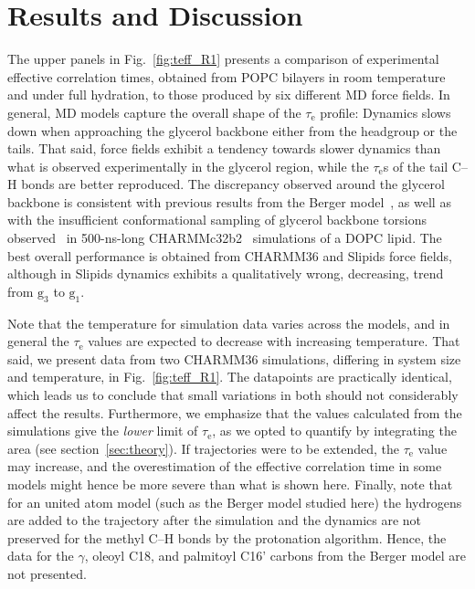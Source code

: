 \documentclass[journal=jpcbfk,manuscript=article,layout=twocolumn]{achemso}
\begin{document}

\section{Results and Discussion}

The upper panels in
Fig.~\ref{fig:teff_R1} presents a comparison of experimental effective correlation times, obtained from POPC bilayers in room temperature and under full hydration, to those produced by six different MD force fields. In general, MD models capture the overall shape of the $\tau_\mathrm{e}$ profile: Dynamics slows down when approaching the glycerol backbone either from the headgroup or the tails. That said, force fields exhibit a tendency towards slower dynamics than what is observed experimentally in the glycerol region, while the $\tau_\mathrm{e}$s of the tail C--H bonds are better reproduced. The discrepancy observed around the glycerol backbone is consistent with previous results from the Berger model~\cite{ferreira15}, as well as with the insufficient conformational sampling of glycerol backbone torsions observed~\cite{vogel12} in 500-ns-long CHARMMc32b2~\cite{schlenkrich96,feller00} simulations of a DOPC lipid. %
The best overall performance is obtained from CHARMM36 and Slipids force fields, although in Slipids dynamics exhibits a qualitatively wrong, decreasing, trend from $\mathrm g_{3}$ to $\mathrm g_{1}$. 


Note that the temperature for simulation data varies across the models, and in general the $\tau_\mathrm{e}$ values are expected to decrease with increasing temperature. That said, we present data from two CHARMM36 simulations, differing in system size and temperature, in Fig.~\ref{fig:teff_R1}. The datapoints are practically identical, which leads us to conclude that small variations in both should not considerably affect the results. Furthermore,  we emphasize that the values calculated from the simulations give the \textit{lower} limit of $\tau_\mathrm{e}$, as we opted to quantify by integrating the area (see section~\ref{sec:theory}). If trajectories were to be extended, the $\tau_\mathrm{e}$ value may increase, and the overestimation of the effective correlation time in some models might hence be more severe than what is shown here. Finally, note that for an united atom model (such as the Berger model studied here) the hydrogens are added to the trajectory after the simulation and the dynamics are not preserved for the methyl C--H bonds by the protonation algorithm. Hence, the data for the $\gamma$, oleoyl C18, and palmitoyl C16' carbons from the Berger model are not presented.
\end{document}
